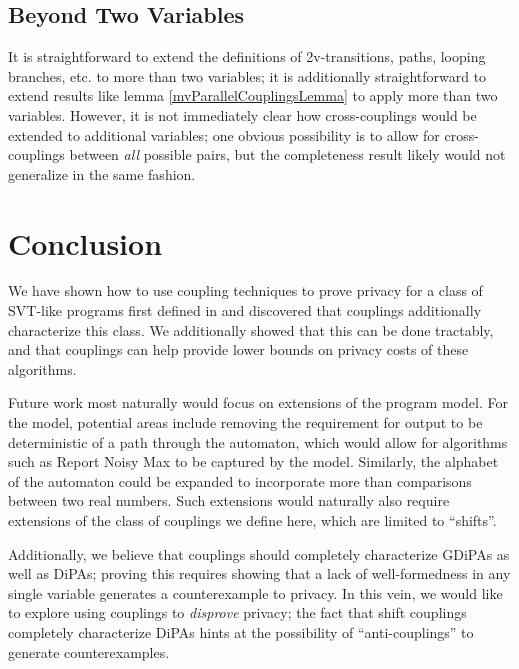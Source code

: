 \subsection{Beyond Two Variables}


It is straightforward to extend the definitions of 2v-transitions, paths, looping branches, etc. to more than two variables; it is additionally straightforward to extend results like lemma \ref{mvParallelCouplingsLemma} to apply more than two variables. However, it is not immediately clear how cross-couplings would be extended to additional variables;
one obvious possibility is to allow for cross-couplings between \textit{all} possible pairs, but the completeness result likely would not generalize in the same fashion. 

\section{Conclusion}
We have shown how to use coupling techniques to prove privacy for a class of SVT-like programs first defined in \cite{chadhaLinearTimeDecidability2021} and discovered that couplings additionally characterize this class. We additionally showed that this can be done tractably, and that couplings can help provide lower bounds on privacy costs of these algorithms. 

Future work most naturally would focus on extensions of the program model. For the model, potential areas include removing the requirement for output to be deterministic of a path through the automaton, which would allow for algorithms such as Report Noisy Max to be captured by the model. Similarly, the alphabet of the automaton could be expanded to incorporate more than comparisons between two real numbers. 
Such extensions would naturally also require extensions of the class of couplings we define here, which are limited to ``shifts''. 

Additionally, we believe that couplings should completely characterize GDiPAs as well as DiPAs; proving this requires showing that a lack of well-formedness in any single variable generates a counterexample to privacy. 
In this vein, we would like to explore using couplings to \textit{disprove} privacy; the fact that shift couplings completely characterize DiPAs hints at the possibility of ``anti-couplings'' to generate counterexamples.